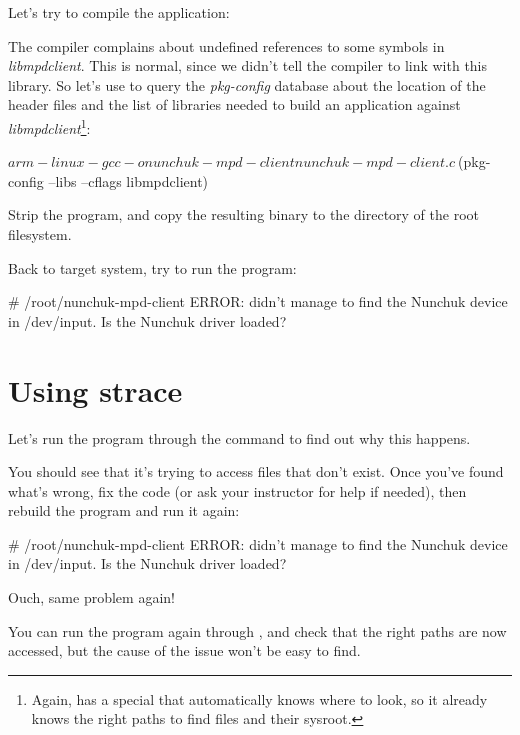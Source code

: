 Let's try to compile the application:


The compiler complains about undefined references to some symbols in
{\em libmpdclient}. This is normal, since we didn't tell the compiler
to link with this library. So let's use  to query the
{\em pkg-config} database about the location of the header files and
the list of libraries needed to build an application against
{\em libmpdclient}\footnote{Again,  has a special
 that automatically knows where to look, so it
already knows the right paths to find  files and their
sysroot.}:

\begin{bashinput}
$ arm-linux-gcc -o nunchuk-mpd-client nunchuk-mpd-client.c \
$(pkg-config --libs --cflags libmpdclient)
\end{bashinput}

Strip the  program, and copy
the resulting binary to the  directory of the root
filesystem.

Back to target system, try to run the program:

\begin{bashinput}
# /root/nunchuk-mpd-client
ERROR: didn't manage to find the Nunchuk device in /dev/input. Is the Nunchuk driver loaded?
\end{bashinput}

\section{Using strace}

Let's run the program through the  command to find out why
this happens.

You should see that it's trying to access files that don't exist.
Once you've found what's wrong, fix the code (or ask your instructor for
help if needed), then rebuild the program and run it again:

\begin{bashinput}
# /root/nunchuk-mpd-client
ERROR: didn't manage to find the Nunchuk device in /dev/input. Is the Nunchuk driver loaded?
\end{bashinput}

Ouch, same problem again!

You can run the program again through , and check that the
right paths are now accessed, but the cause of the issue won't be easy
to find.

